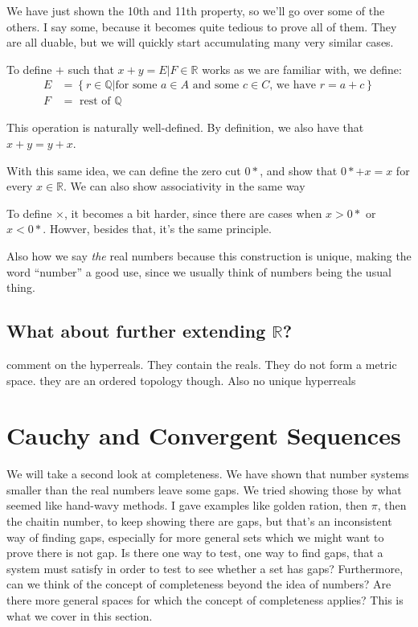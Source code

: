 \documentclass{book}
\newcommand{\Q}{{\mathbb{Q}}}
\newcommand{\R}{{\mathbb{R}}}
\begin{document}
We have just shown the 10th and 11th property, so we'll go over some of the others. I say some, because it becomes quite tedious
to prove all of them. They are all duable, but we will quickly start accumulating many very similar cases.


To define $+$ such that $x + y = E|F \in \R$ works as we are familiar with, we define:
\begin{align*}
	E &= \left\{ r \in \Q | \text{for some $a \in A$ and some $c \in C$, we have $r = a + c$} \right\}\\
	F &= \text{ rest of $\Q$}
\end{align*}

This operation is naturally well-defined. By definition, we also have that $x +y = y + x$.

With this same idea, we can define the zero cut $0*$, and show that $0* + x = x$ for every $x \in \R$. We can also show
associativity in the same way

To define $\times$, it becomes a bit harder, since there are cases when $x > 0*$ or $x < 0*$. Howver, besides that, it's
the same principle.


Also how we say \emph{the} real numbers because this construction is unique, making the word ``number'' a good use,
since we usually think of numbers being the usual thing.

\subsection[What about further extending the real numbers?]{What about further extending $\R$?}

comment on the hyperreals. They contain the reals. They do not form a metric space. they are an ordered topology though.
Also no unique hyperreals

\section{Cauchy and Convergent Sequences}

We will take a second look at completeness. We have shown that number systems smaller than the real numbers leave
some gaps. We tried showing those by what seemed like hand-wavy methods. I gave examples like golden ration, then $\pi$,
then the chaitin number, to keep showing there are gaps, but that's an inconsistent way of finding gaps,
especially for more general sets which we might want to prove there is not gap. Is there one way to test, one way to
find gaps, that a system must satisfy in order to test to see whether
a set has gaps? Furthermore, can we think of the concept of completeness beyond the idea of numbers? Are there more
general spaces for which the concept of completeness applies? This is what we cover in this section.
\end{document}
